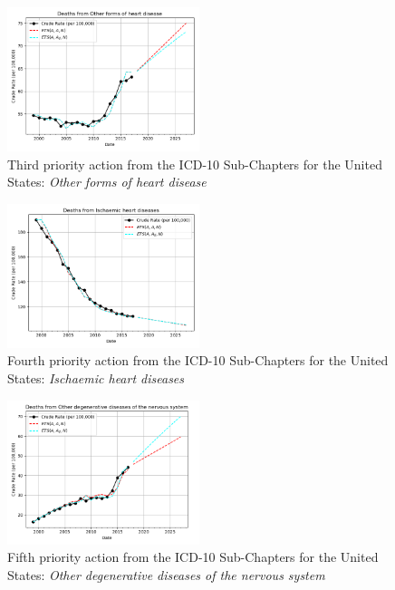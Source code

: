 \documentclass[10pt, a4paper, twocolumn]{IEEEconf}
\begin{document}
\begin{figure}[H]
  \centering
  \includegraphics[width=0.5\textwidth]{results/US_ICD10_SUB_CHAPTERS/Other_forms_of_heart_disease_ets.png}
  \caption{Third priority action from the ICD-10 Sub-Chapters for the United States: \textit{Other forms of heart disease}}\label{fig:k6c}
\end{figure}
  
\begin{figure}[H]
  \centering
  \includegraphics[width=0.5\textwidth]{results/US_ICD10_SUB_CHAPTERS/Ischaemic_heart_diseases_ets.png}
  \caption{Fourth priority action from the ICD-10 Sub-Chapters for the United States: \textit{Ischaemic heart diseases}}\label{fig:k6d}
\end{figure}
  
\begin{figure}[H]
  \centering
  \includegraphics[width=0.5\textwidth]{results/US_ICD10_SUB_CHAPTERS/Other_degenerative_diseases_of_the_nervous_system_ets.png}
  \caption{Fifth priority action from the ICD-10 Sub-Chapters for the United States: \textit{Other degenerative diseases of the nervous system}}\label{fig:k6e}
\end{figure}
  
\end{document}
